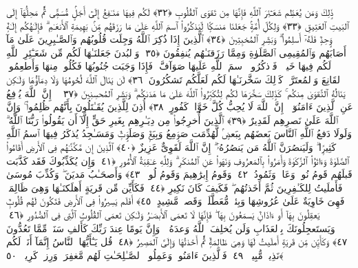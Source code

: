  ذَٟلِكَ وَمَن يُعَظِّم شَعَـٰٓئِرَ ٱللَّهِ فَإِنَّهَا مِن تَقوَى ٱلقُلُوبِ ﴿٣٢﴾
 لَكُم فِيهَا مَنَـٰفِعُ إِلَىٰٓ أَجَلٍۢ مُّسَمًّۭى ثُمَّ مَحِلُّهَآ إِلَى ٱلبَيتِ ٱلعَتِيقِ ﴿٣٣﴾
 وَلِكُلِّ أُمَّةٍۢ جَعَلنَا مَنسَكًۭا لِّيَذكُرُوا۟ ٱسمَ ٱللَّهِ عَلَىٰ مَا رَزَقَهُم مِّنۢ بَهِيمَةِ ٱلأَنعَـٰمِ ۗ فَإِلَـٰهُكُم إِلَـٰهٌۭ وَٟحِدٌۭ فَلَهُۥٓ أَسلِمُوا۟ ۗ وَبَشِّرِ ٱلمُخبِتِينَ ﴿٣٤﴾
 ٱلَّذِينَ إِذَا ذُكِرَ ٱللَّهُ وَجِلَت قُلُوبُهُم وَٱلصَّـٰبِرِينَ عَلَىٰ مَآ أَصَابَهُم وَٱلمُقِيمِى ٱلصَّلَوٰةِ وَمِمَّا رَزَقنَـٰهُم يُنفِقُونَ ﴿٣٥﴾
 وَٱلبُدنَ جَعَلنَـٰهَا لَكُم مِّن شَعَـٰٓئِرِ ٱللَّهِ لَكُم فِيهَا خَيرٌۭ ۖ فَٱذكُرُوا۟ ٱسمَ ٱللَّهِ عَلَيهَا صَوَآفَّ ۖ فَإِذَا وَجَبَت جُنُوبُهَا فَكُلُوا۟ مِنهَا وَأَطعِمُوا۟ ٱلقَانِعَ وَٱلمُعتَرَّ ۚ كَذَٟلِكَ سَخَّرنَـٰهَا لَكُم لَعَلَّكُم تَشكُرُونَ ﴿٣٦﴾
 لَن يَنَالَ ٱللَّهَ لُحُومُهَا وَلَا دِمَآؤُهَا وَلَـٰكِن يَنَالُهُ ٱلتَّقوَىٰ مِنكُم ۚ كَذَٟلِكَ سَخَّرَهَا لَكُم لِتُكَبِّرُوا۟ ٱللَّهَ عَلَىٰ مَا هَدَىٰكُم ۗ وَبَشِّرِ ٱلمُحسِنِينَ ﴿٣٧﴾
 ۞ إِنَّ ٱللَّهَ يُدَٟفِعُ عَنِ ٱلَّذِينَ ءَامَنُوٓا۟ ۗ إِنَّ ٱللَّهَ لَا يُحِبُّ كُلَّ خَوَّانٍۢ كَفُورٍ ﴿٣٨﴾
 أُذِنَ لِلَّذِينَ يُقَـٰتَلُونَ بِأَنَّهُم ظُلِمُوا۟ ۚ وَإِنَّ ٱللَّهَ عَلَىٰ نَصرِهِم لَقَدِيرٌ ﴿٣٩﴾
 ٱلَّذِينَ أُخرِجُوا۟ مِن دِيَـٰرِهِم بِغَيرِ حَقٍّ إِلَّآ أَن يَقُولُوا۟ رَبُّنَا ٱللَّهُ ۗ وَلَولَا دَفعُ ٱللَّهِ ٱلنَّاسَ بَعضَهُم بِبَعضٍۢ لَّهُدِّمَت صَوَٟمِعُ وَبِيَعٌۭ وَصَلَوَٟتٌۭ وَمَسَـٰجِدُ يُذكَرُ فِيهَا ٱسمُ ٱللَّهِ كَثِيرًۭا ۗ وَلَيَنصُرَنَّ ٱللَّهُ مَن يَنصُرُهُۥٓ ۗ إِنَّ ٱللَّهَ لَقَوِىٌّ عَزِيزٌ ﴿٤٠﴾
 ٱلَّذِينَ إِن مَّكَّنَّـٰهُم فِى ٱلأَرضِ أَقَامُوا۟ ٱلصَّلَوٰةَ وَءَاتَوُا۟ ٱلزَّكَوٰةَ وَأَمَرُوا۟ بِٱلمَعرُوفِ وَنَهَوا۟ عَنِ ٱلمُنكَرِ ۗ وَلِلَّهِ عَـٰقِبَةُ ٱلأُمُورِ ﴿٤١﴾
 وَإِن يُكَذِّبُوكَ فَقَد كَذَّبَت قَبلَهُم قَومُ نُوحٍۢ وَعَادٌۭ وَثَمُودُ ﴿٤٢﴾
 وَقَومُ إِبرَٰهِيمَ وَقَومُ لُوطٍۢ ﴿٤٣﴾
 وَأَصحَـٰبُ مَديَنَ ۖ وَكُذِّبَ مُوسَىٰ فَأَملَيتُ لِلكَـٰفِرِينَ ثُمَّ أَخَذتُهُم ۖ فَكَيفَ كَانَ نَكِيرِ ﴿٤٤﴾
 فَكَأَيِّن مِّن قَريَةٍ أَهلَكنَـٰهَا وَهِىَ ظَالِمَةٌۭ فَهِىَ خَاوِيَةٌ عَلَىٰ عُرُوشِهَا وَبِئرٍۢ مُّعَطَّلَةٍۢ وَقَصرٍۢ مَّشِيدٍ ﴿٤٥﴾
 أَفَلَم يَسِيرُوا۟ فِى ٱلأَرضِ فَتَكُونَ لَهُم قُلُوبٌۭ يَعقِلُونَ بِهَآ أَو ءَاذَانٌۭ يَسمَعُونَ بِهَا ۖ فَإِنَّهَا لَا تَعمَى ٱلأَبصَـٰرُ وَلَـٰكِن تَعمَى ٱلقُلُوبُ ٱلَّتِى فِى ٱلصُّدُورِ ﴿٤٦﴾
 وَيَستَعجِلُونَكَ بِٱلعَذَابِ وَلَن يُخلِفَ ٱللَّهُ وَعدَهُۥ ۚ وَإِنَّ يَومًا عِندَ رَبِّكَ كَأَلفِ سَنَةٍۢ مِّمَّا تَعُدُّونَ ﴿٤٧﴾
 وَكَأَيِّن مِّن قَريَةٍ أَملَيتُ لَهَا وَهِىَ ظَالِمَةٌۭ ثُمَّ أَخَذتُهَا وَإِلَىَّ ٱلمَصِيرُ ﴿٤٨﴾
 قُل يَـٰٓأَيُّهَا ٱلنَّاسُ إِنَّمَآ أَنَا۠ لَكُم نَذِيرٌۭ مُّبِينٌۭ ﴿٤٩﴾
 فَٱلَّذِينَ ءَامَنُوا۟ وَعَمِلُوا۟ ٱلصَّـٰلِحَـٰتِ لَهُم مَّغفِرَةٌۭ وَرِزقٌۭ كَرِيمٌۭ ﴿٥٠﴾
